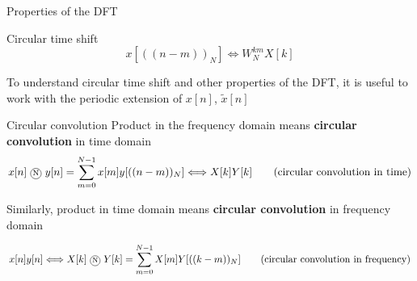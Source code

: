 \documentclass[10pt]{beamer}
\begin{document}
%
\begin{frame}{Properties of the DFT}
	\centering
\end{frame}

%
\begin{frame}{Circular time shift}
\begin{equation*}
	x[((n-m))_N] \Longleftrightarrow W_N^{km}X[k] \tag{circular time shift}
\end{equation*}

To understand circular time shift and other properties of the DFT, it is useful to work with the periodic extension of $x[n]$, $\tilde{x}[n]$

\begin{center}
	\resizebox{\textwidth}{!}{}
\end{center}
\end{frame}

%
\begin{frame}{Circular convolution}
	Product in the frequency domain means \textbf{circular convolution} in time domain
	\begin{equation*}
		x[n]~\encircle{N}~y[n] = \sum_{m=0}^{N-1} x[m]y[((n-m))_N] \Longleftrightarrow X[k]Y[k] \tag{circular convolution in time}
	\end{equation*}
	
	Similarly, product in time domain means \textbf{circular convolution} in frequency domain
	
	\begin{equation*}
	x[n]y[n] \Longleftrightarrow X[k]~\encircle{N}~Y[k] = \sum_{m=0}^{N-1} X[m]Y[((k-m))_N] \tag{circular convolution in frequency}
	\end{equation*}
\end{frame}
\end{document}
